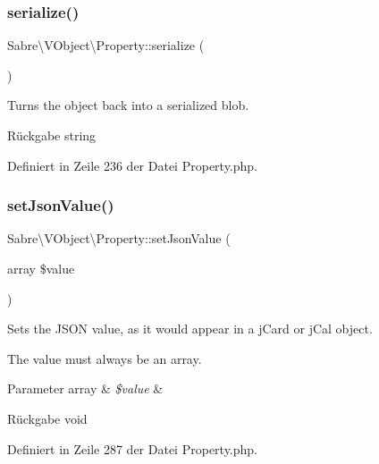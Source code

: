 \subsubsection{\texorpdfstring{serialize()}{serialize()}}
{\footnotesize\ttfamily Sabre\textbackslash{}\+V\+Object\textbackslash{}\+Property\+::serialize (\begin{DoxyParamCaption}{ }\end{DoxyParamCaption})}

Turns the object back into a serialized blob.

\begin{DoxyReturn}{Rückgabe}
string 
\end{DoxyReturn}


Definiert in Zeile 236 der Datei Property.\+php.

\mbox{\label{class_sabre_1_1_v_object_1_1_property_a4052644658d3bac7f0256ffe445f1674}} 
\subsubsection{\texorpdfstring{set\+Json\+Value()}{setJsonValue()}}
{\footnotesize\ttfamily Sabre\textbackslash{}\+V\+Object\textbackslash{}\+Property\+::set\+Json\+Value (\begin{DoxyParamCaption}\item[{array}]{\$value }\end{DoxyParamCaption})}

Sets the J\+S\+ON value, as it would appear in a j\+Card or j\+Cal object.

The value must always be an array.


\begin{DoxyParams}[1]{Parameter}
array & {\em \$value} & \\
\hline
\end{DoxyParams}
\begin{DoxyReturn}{Rückgabe}
void 
\end{DoxyReturn}


Definiert in Zeile 287 der Datei Property.\+php.

\mbox{\label{class_sabre_1_1_v_object_1_1_property_acbaa8898c7ee61819c53413ee5b92519}} 
